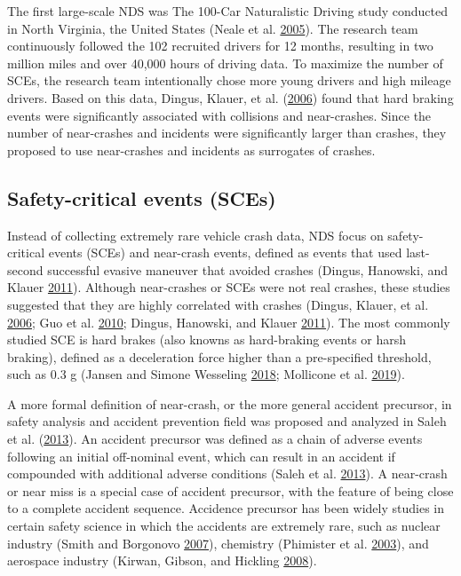 \documentclass[12pt]{book}
\numberwithin{equation}{chapter}
\begin{document}
The first large-scale NDS was The 100-Car Naturalistic Driving study conducted in North Virginia, the United States (Neale et al. \protect\hyperlink{ref-neale2005overview}{2005}). The research team continuously followed the 102 recruited drivers for 12 months, resulting in two million miles and over 40,000 hours of driving data. To maximize the number of SCEs, the research team intentionally chose more young drivers and high mileage drivers. Based on this data, Dingus, Klauer, et al. (\protect\hyperlink{ref-dingus2006100}{2006}) found that hard braking events were significantly associated with collisions and near-crashes. Since the number of near-crashes and incidents were significantly larger than crashes, they proposed to use near-crashes and incidents as surrogates of crashes.

\hypertarget{safety-critical-events-sces}{%
\subsection{Safety-critical events (SCEs)}\label{safety-critical-events-sces}}

Instead of collecting extremely rare vehicle crash data, NDS focus on safety-critical events (SCEs) and near-crash events, defined as events that used last-second successful evasive maneuver that avoided crashes (Dingus, Hanowski, and Klauer \protect\hyperlink{ref-dingus2011estimating}{2011}). Although near-crashes or SCEs were not real crashes, these studies suggested that they are highly correlated with crashes (Dingus, Klauer, et al. \protect\hyperlink{ref-dingus2006100}{2006}; Guo et al. \protect\hyperlink{ref-guo2010near}{2010}; Dingus, Hanowski, and Klauer \protect\hyperlink{ref-dingus2011estimating}{2011}). The most commonly studied SCE is hard brakes (also knowns as hard-braking events or harsh braking), defined as a deceleration force higher than a pre-specified threshold, such as 0.3 g (Jansen and Simone Wesseling \protect\hyperlink{ref-jansen2018harsh}{2018}; Mollicone et al. \protect\hyperlink{ref-mollicone2019predicting}{2019}).

A more formal definition of near-crash, or the more general accident precursor, in safety analysis and accident prevention field was proposed and analyzed in Saleh et al. (\protect\hyperlink{ref-saleh2013accident}{2013}). An accident precursor was defined as a chain of adverse events following an initial off-nominal event, which can result in an accident if compounded with additional adverse conditions (Saleh et al. \protect\hyperlink{ref-saleh2013accident}{2013}). A near-crash or near miss is a special case of accident precursor, with the feature of being close to a complete accident sequence. Accidence precursor has been widely studies in certain safety science in which the accidents are extremely rare, such as nuclear industry (Smith and Borgonovo \protect\hyperlink{ref-smith2007decision}{2007}), chemistry (Phimister et al. \protect\hyperlink{ref-phimister2003near}{2003}), and aerospace industry (Kirwan, Gibson, and Hickling \protect\hyperlink{ref-kirwan2008human}{2008}).
\end{document}
